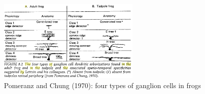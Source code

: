 \begin{figure}[hbt]
  \centerline{\includegraphics[height=4cm,
    angle=0]{./images/neurons-frog-eyes.eps}}    
\caption{Pomeranz and Chung (1970): four types of ganglion cells in frogs}
\label{fig:neurons-frog-eyes}
\end{figure}



